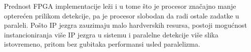 Prednost FPGA implementacije leži i u tome što je procesor značajno
manje opterećen prilikom detekcije, pa je procesor slobodan da radi ostale
zadatke u paraleli.
Pošto IP jezgra zauzimaju malo hardverskih resursa, postoji mogućnost
instancioniranja više IP jezgra u sistemu i paralelne detekcije više slika
istovremeno, pritom bez gubitaka performansi usled paralelizma. \\